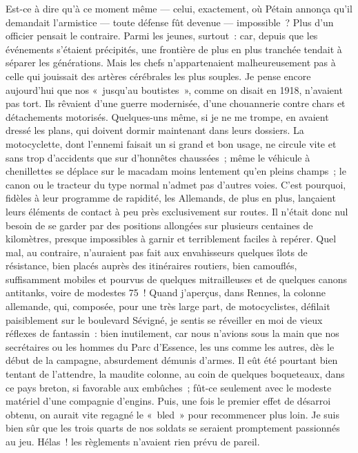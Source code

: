\documentclass[french,twoside]{book} %
\begin{document}
Est-ce à dire qu’à ce moment même — celui, exactement, où Pétain annonça qu’il demandait l’ar­mistice — toute défense fût devenue — impossible ? Plus d’un officier pensait le contraire. Parmi les jeunes, surtout : car, depuis que les événements s’étaient précipités, une frontière de plus en plus tranchée tendait à séparer les générations. Mais les chefs n’appartenaient malheureusement pas à celle qui jouissait des artères cérébrales les plus souples. Je pense encore aujourd’hui que nos « jusqu’au­ boutistes », comme on disait en 1918, n’avaient pas tort. Ils rêvaient d’une guerre modernisée, d’une chouannerie contre chars et détachements motorisés. Quelques-uns même, si je ne me trompe, en avaient dressé les plans, qui doivent dormir maintenant dans leurs dossiers. La motocyclette, dont l’ennemi faisait un si grand et bon usage, ne circule vite et sans trop d’accidents que sur d’honnêtes chaussées ; même le véhicule à chenillettes se déplace sur le macadam moins lentement qu’en pleins champs ; le canon ou le tracteur du type normal n’admet pas d’autres voies. C’est pourquoi, fidèles à leur programme de rapidité, les Allemands, de plus en plus, lançaient leurs éléments de contact à peu près exclusivement sur routes. Il n’était donc nul besoin de se garder par des   positions allongées sur plusieurs centaines de kilomètres, presque impossibles à garnir et terriblement faciles à repérer. Quel mal, au contraire, n’auraient pas fait aux envahisseurs quelques îlots de résistance, bien placés auprès des itinéraires routiers, bien camouflés, suffisamment mobiles et pourvus de quelques mitrailleuses et de quelques canons antitanks, voire de modestes 75 ! Quand j’aperçus, dans Rennes, la colonne allemande, qui, composée, pour une très large part, de motocyclistes, défilait paisiblement sur le boulevard Sévigné, je sentis se réveiller en moi de vieux réflexes de fantassin : bien inutilement, car nous n’avions sous la main que nos secrétaires ou les hommes du Parc d’Essence, les uns comme les autres, dès le début de la campagne, absurdement démunis d’armes. Il eût été pourtant bien tentant de l’attendre, la maudite colonne, au coin de quelques boqueteaux, dans ce pays breton, si favorable aux embûches ; fût-ce seulement avec le modeste matériel d’une compagnie d’engins. Puis, une fois le premier effet de désarroi obtenu, on aurait vite regagné le « bled » pour recommencer plus loin. Je suis bien sûr que les trois quarts de nos soldats se seraient promptement passionnés au jeu. Hélas ! les règlements n’avaient rien prévu de pareil.\par
\end{document}

